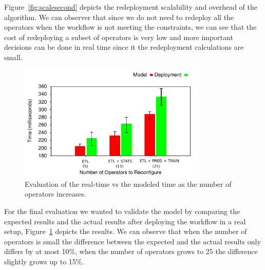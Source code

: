 Figure~\ref{fig:scalesecond} depicts the redeployment scalability and overhead of the algorithm. We can observer that since we do not need to redeploy all the operators when the workflow is not meeting the constraints, we can see that the cost of redeploying a subset of operators is very low and more important decisions can be done in real time since it the redeployment calculations are small.

\begin{figure}[h]
  \centering
  \includegraphics[width=0.8\textwidth]{Results/Time.pdf}
  \caption{Evaluation of the real-time vs the modeled time as the number of operators increases.}\label{fig:validation} 
\end{figure}

For the final evaluation we wanted to validate the model by comparing the expected results and the actual results after deploying the workflow in a real setup, Figure~\ref{fig:validation} depicts the results. We can observe that when the number of operators is small the difference between the expected and the actual results only differs by at most 10\%, when the number of operators grows to 25 the difference slightly grows up to 15\%.
